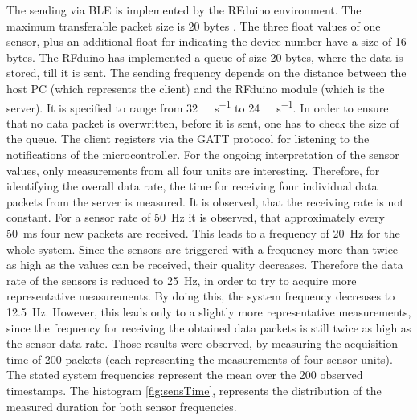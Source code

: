 The sending via BLE is implemented by the RFduino environment. The maximum transferable packet size is 20 bytes \cite{rfduino2015data}. The three float values of one sensor, plus an additional float for indicating the device number have a size of 16 bytes. The RFduino has implemented a queue of size 20 bytes, where the data is stored, till it is sent. The sending frequency depends on the distance between the host PC (which represents the client) and the RFduino module (which is the server). It is specified to range from \SI[per-mode=symbol]{32}{\kilo \bit \per \second} to \SI[per-mode=symbol]{24}{\kilo \bit \per \second}. In order to ensure that no data packet is overwritten, before it is sent, one has to check the size of the queue. The client registers via the \ac{GATT} protocol for listening to the notifications of the microcontroller. For the ongoing interpretation of the sensor values, only measurements from all four units are interesting. Therefore, for identifying the overall data rate, the time for receiving four individual data packets from the server is measured. It is observed, that the receiving rate is not constant. For a sensor rate of \SI{50}{\Hz} it is observed, that approximately every \SI{50}{\ms} four new packets are received. This leads to a frequency of \SI{20}{\Hz} for the whole system. Since the sensors are triggered with a frequency more than twice as high as the values can be received, their quality decreases. Therefore the data rate of the sensors is reduced to \SI{25}{\Hz}, in order to try to acquire more representative measurements. By doing this, the system frequency decreases to \SI{12.5}{\Hz}. However, this leads only to a slightly more representative measurements, since the frequency for receiving the obtained data packets is still twice as high as the sensor data rate. Those results were observed, by measuring the acquisition time of 200 packets (each representing the measurements of four sensor units). The stated system frequencies represent the mean over the 200 observed timestamps. The histogram \ref{fig:sensTime}, represents the distribution of the measured duration for both sensor frequencies.


